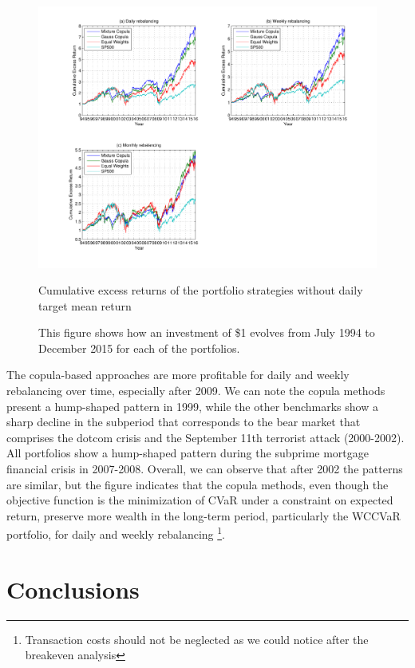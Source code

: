 \documentclass[a4paper,10pt]{article}
\begin{document}
\begin{figure}[htbp]
	\hspace*{-2cm} 
	\includegraphics[scale=0.7]{fig1_rpwcop.pdf}
	\caption{\scriptsize Cumulative excess returns of the portfolio strategies without daily target mean return }
	\caption*{This figure shows how an investment of \$1 evolves from July 1994 to December 2015 for each of the portfolios.}
	\label{fig:fig01}
\end{figure}

The copula-based approaches are more profitable for daily and weekly rebalancing over time, especially after 2009. We can note the copula methods present a hump-shaped pattern in 1999, while the other benchmarks show a sharp decline in the subperiod that corresponds to the bear market that comprises the dotcom crisis and the September 11th terrorist attack (2000-2002). All portfolios show a hump-shaped pattern during the subprime mortgage financial crisis in 2007-2008. Overall, we can observe that after 2002 the patterns are similar, but the figure indicates that the copula methods, even though the objective function is the minimization of CVaR under a constraint on expected return, preserve more wealth in the long-term period, particularly the WCCVaR portfolio, for daily and weekly rebalancing \footnote{Transaction costs should not be neglected as we could notice after the breakeven analysis}.



\vspace{0.3cm}


\section{Conclusions}
\end{document}
